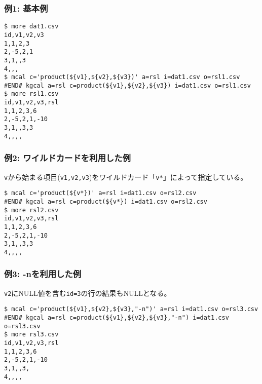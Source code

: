 \subsubsection*{例1: 基本例}



\begin{Verbatim}[baselinestretch=0.7,frame=single]
$ more dat1.csv
id,v1,v2,v3
1,1,2,3
2,-5,2,1
3,1,,3
4,,,
$ mcal c='product(${v1},${v2},${v3})' a=rsl i=dat1.csv o=rsl1.csv
#END# kgcal a=rsl c=product(${v1},${v2},${v3}) i=dat1.csv o=rsl1.csv
$ more rsl1.csv
id,v1,v2,v3,rsl
1,1,2,3,6
2,-5,2,1,-10
3,1,,3,3
4,,,,
\end{Verbatim}
\subsubsection*{例2: ワイルドカードを利用した例}

\verb|v|から始まる項目(\verb|v1,v2,v3|)をワイルドカード「\verb|v*|」によって指定している。


\begin{Verbatim}[baselinestretch=0.7,frame=single]
$ mcal c='product(${v*})' a=rsl i=dat1.csv o=rsl2.csv
#END# kgcal a=rsl c=product(${v*}) i=dat1.csv o=rsl2.csv
$ more rsl2.csv
id,v1,v2,v3,rsl
1,1,2,3,6
2,-5,2,1,-10
3,1,,3,3
4,,,,
\end{Verbatim}
\subsubsection*{例3: -nを利用した例}

\verb|v2|にNULL値を含む\verb|id=3|の行の結果もNULLとなる。


\begin{Verbatim}[baselinestretch=0.7,frame=single]
$ mcal c='product(${v1},${v2},${v3},"-n")' a=rsl i=dat1.csv o=rsl3.csv
#END# kgcal a=rsl c=product(${v1},${v2},${v3},"-n") i=dat1.csv o=rsl3.csv
$ more rsl3.csv
id,v1,v2,v3,rsl
1,1,2,3,6
2,-5,2,1,-10
3,1,,3,
4,,,,
\end{Verbatim}
